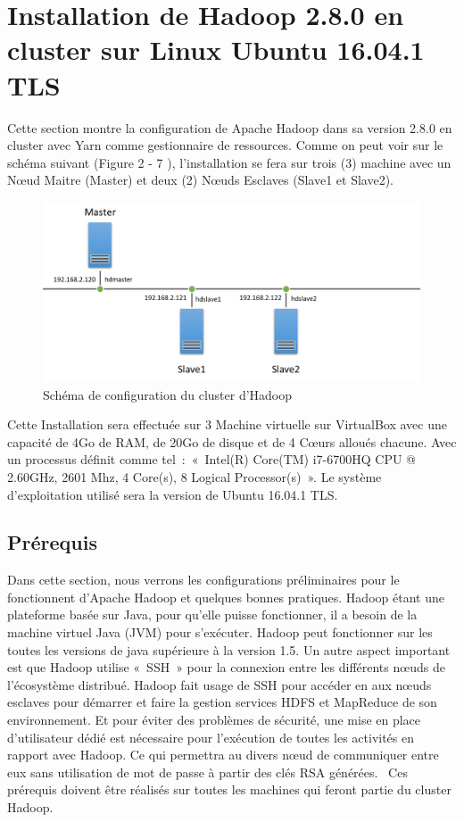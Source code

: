 \documentclass[12pt,french]{book}
\begin{document}
\section{Installation de Hadoop 2.8.0 en cluster sur Linux Ubuntu 16.04.1 TLS}

Cette section montre la configuration de Apache Hadoop dans sa version 2.8.0 en cluster avec Yarn comme gestionnaire de ressources. Comme on peut voir sur le schéma suivant (Figure 2 - 7 ), l’installation se fera sur trois (3) machine avec un Nœud Maitre (Master) et  deux (2) Nœuds Esclaves (Slave1 et Slave2). 


\begin{figure}[ht]
	\centering
	\includegraphics[width=\linewidth]{clusterSchema}
	\caption{Schéma de configuration du cluster d'Hadoop}
\end{figure}

Cette Installation sera effectuée sur 3 Machine virtuelle sur VirtualBox avec une capacité de 4Go de RAM, de 20Go de disque et de 4 Cœurs alloués chacune. Avec un processus définit comme tel : « Intel(R) Core(TM) i7-6700HQ CPU @ 2.60GHz, 2601 Mhz, 4 Core(s), 8 Logical Processor(s) ». Le système d’exploitation utilisé sera la version de Ubuntu 16.04.1 TLS.

\subsection{Prérequis}

Dans cette section, nous verrons les configurations préliminaires pour le fonctionnent d’Apache Hadoop et quelques bonnes pratiques.
Hadoop étant une plateforme basée sur Java, pour qu’elle puisse fonctionner, il a besoin de la machine virtuel Java (JVM) pour s’exécuter.
Hadoop peut fonctionner sur les toutes les versions de java supérieure à la version 1.5.
Un autre aspect important est que Hadoop utilise « SSH » pour la connexion entre les différents nœuds de l’écosystème distribué.
Hadoop fait usage de SSH pour accéder en aux nœuds esclaves pour démarrer et faire la gestion services HDFS et MapReduce de son environnement.
Et pour éviter des problèmes de sécurité, une mise en place d’utilisateur dédié est nécessaire pour l’exécution de toutes les activités en rapport avec Hadoop.
Ce qui permettra au divers nœud de communiquer entre eux sans utilisation de mot de passe à partir des clés RSA générées. 
Ces prérequis doivent être réalisés sur toutes les machines qui feront partie du cluster Hadoop.
\end{document}
